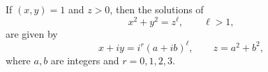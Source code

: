 \begin{proposition}
    If $(x,y)=1$ and $z>0$, then the solutions of
\[
    x^2+y^2=z^\ell,\qquad \ell>1,
\]
    are given by
\[
    x+iy=i^r(a+ib)^\ell,\qquad z=a^2+b^2,
\]
    where $a,b$ are integers and $r=0,1,2,3$.
\end{proposition}
